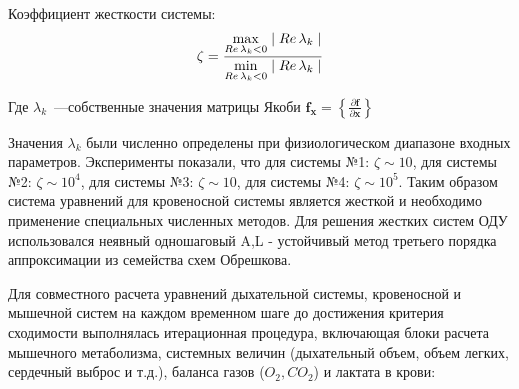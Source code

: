 Коэффициент жесткости системы:
\begin{equation}
    \zeta = \frac{\max \limits_{Re \, \lambda_k < 0} \mid Re \, \lambda_k \mid}{\min \limits_{Re \, \lambda_k < 0} \mid Re \, \lambda_k \mid}\notag
\end{equation}

Где $\lambda_k$~---собственные значения матрицы Якоби $\displaystyle \mathbf{f}_\mathbf{x} = \left\{ \frac{\partial \mathbf{f}}{\partial \mathbf{x}} \right\}$

Значения $\lambda_k$ были численно определены при физиологическом диапазоне входных параметров. Эксперименты показали, что для системы №1: \(\zeta \sim 10\), для системы №2: \(\zeta \sim 10^{4}\), для системы №3: \(\zeta \sim 10\), для системы №4: \(\zeta \sim 10^{5}\). Таким образом система уравнений для кровеносной системы является жесткой и необходимо применение специальных численных методов. Для решения жестких систем ОДУ использовался неявный одношаговый A,L - устойчивый метод третьего порядка аппроксимации из семейства схем Обрешкова. 

Для совместного расчета уравнений дыхательной системы, кровеносной и мышечной систем на каждом временном шаге до достижения критерия сходимости выполнялась итерационная процедура, включающая блоки расчета мышечного метаболизма, системных величин (дыхательный объем, объем легких, сердечный выброс и т.д.), баланса газов ($O_2, CO_2$) и лактата в крови:

